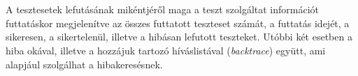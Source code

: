 \medskip
{}\\
\\
\medskip

A tesztesetek lefutásának mikéntjéről maga a teszt szolgáltat információt futtatáskor megjelenítve az összes futtatott teszteset számát, a futtatás idejét, a sikeresen, a sikertelenül, illetve a hibásan lefutott teszteket. Utóbbi két esetben a hiba okával, illetve a hozzájuk tartozó híváslistával (\textit{backtrace}) együtt, ami alapjául szolgálhat a hibakeresésnek.
